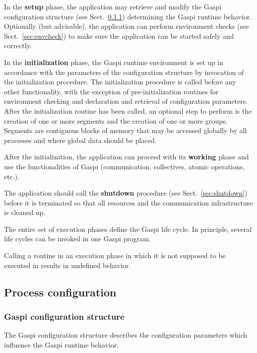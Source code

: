\documentclass[a4paper]{article}
\newlength{\st}\setlength{\st}{0pt}
\newcommand{\GASPI}{{\sc Gaspi}}
\newcommand{\finalsymb}[1]{\leavevmode\unskip\penalty9999\hbox{}\nobreak\hfill\hskip 1em minus 0.5em\hbox{#1}}
\newenvironment{useradvice}{\begin{flushright}\begin{minipage}[t]{0.9\linewidth}\emph{User advice:}}{\finalsymb{$\lrcorner$}\end{minipage}\end{flushright}}
\begin{document}
In the \textbf{setup} phase, the application may retrieve and modify
the \GASPI{} configuration structure (see Sect.~\ref{subsubsec:confstruct})
determining the \GASPI{} runtime behavior. Optionally (but
advisable), the application can perform environment checks (see
Sect.~\ref{sec:envcheck}) to make sure the application can be
started safely and correctly.

In the \textbf{initialization} phase, the \GASPI{} runtime environment
is set up in accordance with the parameters of the configuration
structure by invocation of the initialization procedure.  The
initialization procedure is called before any other functionality,
with the exception of pre-initialization routines for environment
checking and declaration and retrieval of configuration parameters.
After the initialization routine has been called, an optional step to
perform is the creation of one or more segments and the creation of
one or more groups.  Segments are contiguous blocks of memory that may
be accessed globally by all processes and where global data should be
placed.

After the initialization, the application can proceed with its
\textbf{working} phase and use the functionalities of \GASPI{} (communication,
collectives, atomic operations, etc.).

The application should call the
\textbf{shutdown} procedure (see Sect.~\ref{sec:shutdown}) before it is terminated
so that all resources and the communication infrastructure is cleaned up.

The entire set of execution phases define the \GASPI{} life cycle.
In principle, several life cycles can be invoked in one \GASPI{}
program.

Calling a routine in an execution phase in which it is not supposed
to be executed in results in undefined behavior.

\subsection{Process configuration}

\subsubsection{\GASPI{} configuration structure}
\label{subsubsec:confstruct}

The \GASPI{} configuration structure describes the configuration parameters which
influence the \GASPI{} runtime behavior.
\end{document}
